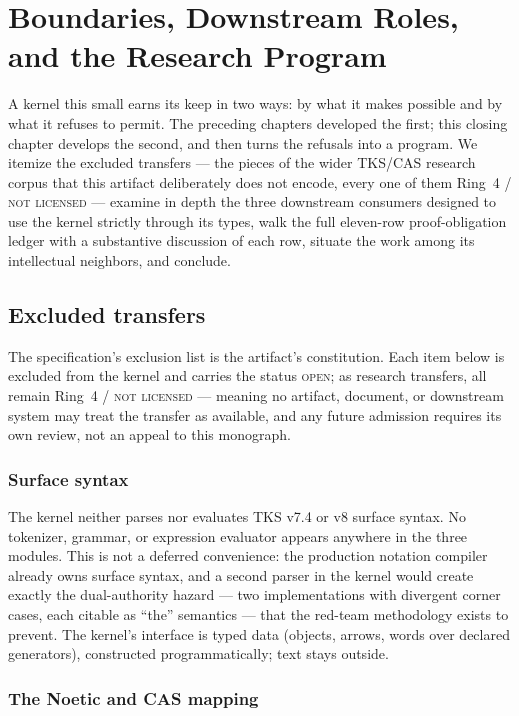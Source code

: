 \chapter{Boundaries, Downstream Roles, and the Research Program}\label{ch12:program}

A kernel this small earns its keep in two ways: by what it makes possible
and by what it refuses to permit. The preceding chapters developed the
first; this closing chapter develops the second, and then turns the
refusals into a program. We itemize the excluded transfers --- the pieces
of the wider TKS/CAS research corpus that this artifact deliberately does
not encode, every one of them Ring~4 / \textsc{not licensed} --- examine
in depth the three downstream consumers designed to use the kernel
strictly through its types, walk the full eleven-row proof-obligation
ledger with a substantive discussion of each row, situate the work among
its intellectual neighbors, and conclude.

\section{Excluded transfers}\label{ch12:sec:excluded}

The specification's exclusion list is the artifact's constitution. Each
item below is excluded from the kernel and carries the status
\textsc{open}; as research transfers, all remain Ring~4 /
\textsc{not licensed} --- meaning no artifact, document, or downstream
system may treat the transfer as available, and any future admission
requires its own review, not an appeal to this monograph.

\subsection{Surface syntax}

The kernel neither parses nor evaluates TKS v7.4 or v8 surface syntax. No
tokenizer, grammar, or expression evaluator appears anywhere in the three
modules. This is not a deferred convenience: the production notation
compiler already owns surface syntax, and a second parser in the kernel
would create exactly the dual-authority hazard --- two implementations
with divergent corner cases, each citable as ``the'' semantics --- that
the red-team methodology exists to prevent. The kernel's interface is
typed data (objects, arrows, words over declared generators), constructed
programmatically; text stays outside.

\subsection{The Noetic and CAS mapping}


